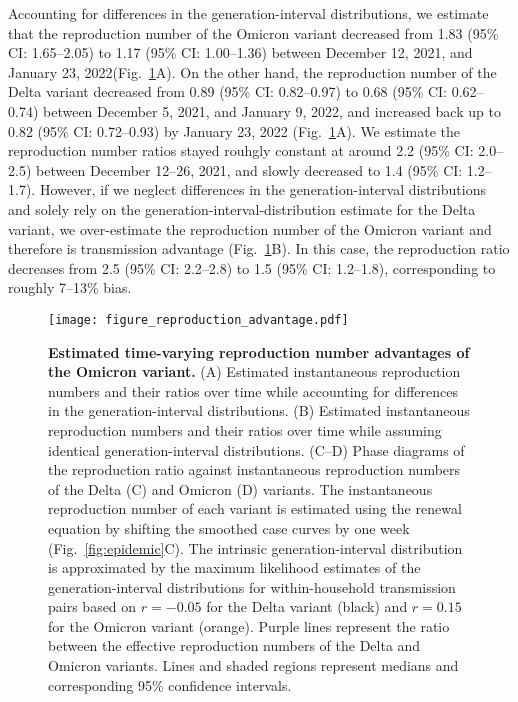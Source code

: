 \documentclass[12pt]{article}
\newcommand{\fref}[1]{Fig.~\ref{fig:#1}}
\begin{document}
Accounting for differences in the generation-interval distributions, we estimate that the reproduction number of the Omicron variant decreased from 1.83 (95\% CI: 1.65--2.05) to 1.17 (95\% CI: 1.00--1.36) between December 12, 2021, and January 23, 2022(\fref{reproduction}A).
On the other hand, the reproduction number of the Delta variant decreased from 0.89 (95\% CI: 0.82--0.97) to 0.68 (95\% CI: 0.62--0.74) between December 5, 2021, and January 9, 2022, and increased back up to 0.82 (95\% CI: 0.72--0.93) by January 23, 2022 (\fref{reproduction}A).
We estimate the reproduction number ratios stayed rouhgly constant at around 2.2 (95\% CI: 2.0--2.5) between December 12--26, 2021, and slowly decreased to 1.4 (95\% CI: 1.2--1.7).
However, if we neglect differences in the generation-interval distributions and solely rely on the generation-interval-distribution estimate for the Delta variant, we over-estimate the reproduction number of the Omicron variant and therefore is transmission advantage (\fref{reproduction}B).
In this case, the reproduction ratio decreases from 2.5 (95\% CI: 2.2--2.8) to 1.5 (95\% CI: 1.2--1.8), corresponding to roughly 7--13\% bias.

\begin{figure}[!th]
\texttt{[image: figure\_reproduction\_advantage.pdf]}
\caption{
\textbf{Estimated time-varying reproduction number advantages of the Omicron variant.}
(A) Estimated instantaneous reproduction numbers and their ratios over time while accounting for differences in the generation-interval distributions.
(B) Estimated instantaneous reproduction numbers and their ratios over time while assuming identical generation-interval distributions.
(C--D) Phase diagrams of the reproduction ratio against instantaneous reproduction numbers of the Delta (C) and Omicron (D) variants.
The instantaneous reproduction number of each variant is estimated using the renewal equation by shifting the smoothed case curves by one week (\fref{epidemic}C).
The intrinsic generation-interval distribution is approximated by the maximum likelihood estimates of the generation-interval distributions for within-household transmission pairs based on $r=-0.05$ for the Delta variant (black) and $r=0.15$ for the Omicron variant (orange).
Purple lines represent the ratio between the effective reproduction numbers of the Delta and Omicron variants.
Lines and shaded regions represent medians and corresponding 95\% confidence intervals.
\label{fig:reproduction}
}
\end{figure}
\end{document}
